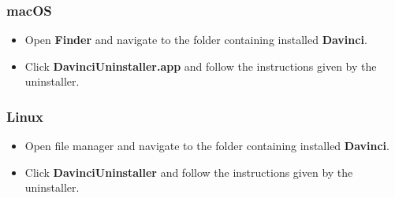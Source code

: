 \subsubsection{macOS}

\begin{itemize}
	\item Open \textbf{Finder} and navigate to the folder containing installed \textbf{Davinci}.
	\item Click \textbf{DavinciUninstaller.app} and follow the instructions given by the uninstaller.
\end{itemize}

\subsubsection{Linux}

\begin{itemize}
	\item Open file manager and navigate to the folder containing installed \textbf{Davinci}.
	\item Click \textbf{DavinciUninstaller} and follow the instructions given by the uninstaller.
\end{itemize}
